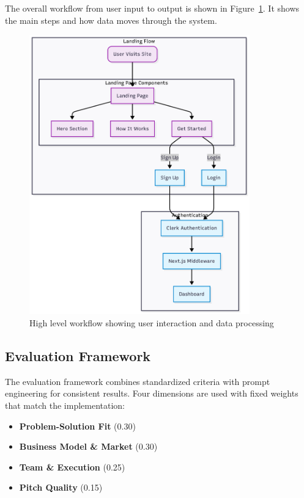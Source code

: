 The overall workflow from user input to output is shown in Figure~\ref{fig:user-flow}. It shows the main steps and how data moves through the system.

\begin{figure}[H]
  \centering
  \includegraphics[width=0.85\textwidth]{img/user-diagram-flow}
\caption{High level workflow showing user interaction and data processing}
  \label{fig:user-flow}
\end{figure}

\subsection{Evaluation Framework}\label{subsec:evaluation-framework}
The evaluation framework combines standardized criteria with prompt engineering for consistent results. Four dimensions are used with fixed weights that match the implementation:

\begin{itemize}
  \item \textbf{Problem\mbox{-}Solution Fit} (0.30)
  \item \textbf{Business Model \& Market} (0.30)
  \item \textbf{Team \& Execution} (0.25)
  \item \textbf{Pitch Quality} (0.15)
\end{itemize}

